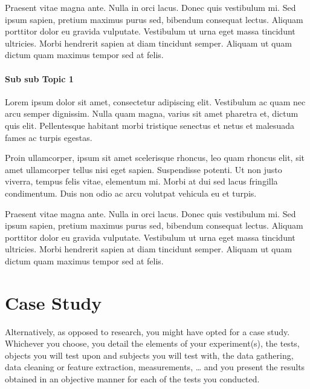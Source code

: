 \documentclass[12pt,a4paper]{report}
\newcommand{\daechapter}[1]{
  \chapter*{#1} %
  \addcontentsline{toc}{chapter}{#1} %
}
\begin{document}
\begin{gbox}
Praesent vitae magna ante. Nulla in orci lacus. Donec quis vestibulum mi. Sed ipsum sapien, pretium maximus purus sed, bibendum consequat lectus. Aliquam porttitor dolor eu gravida vulputate. Vestibulum ut urna eget massa tincidunt ultricies. Morbi hendrerit sapien at diam tincidunt semper. Aliquam ut quam dictum quam maximus tempor sed at felis.
\end{gbox}

\subsubsection{Sub sub Topic 1}

\begin{gbox}
Lorem ipsum dolor sit amet, consectetur adipiscing elit. Vestibulum ac quam nec arcu semper dignissim. Nulla quam magna, varius sit amet pharetra et, dictum quis elit. Pellentesque habitant morbi tristique senectus et netus et malesuada fames ac turpis egestas.
\end{gbox}

\begin{gbox}
Proin ullamcorper, ipsum sit amet scelerisque rhoncus, leo quam rhoncus elit, sit amet ullamcorper tellus nisi eget sapien. Suspendisse potenti. Ut non justo viverra, tempus felis vitae, elementum mi. Morbi at dui sed lacus fringilla condimentum. Duis non odio ac arcu volutpat vehicula eu et turpis.
\end{gbox}

\begin{gbox}
Praesent vitae magna ante. Nulla in orci lacus. Donec quis vestibulum mi. Sed ipsum sapien, pretium maximus purus sed, bibendum consequat lectus. Aliquam porttitor dolor eu gravida vulputate. Vestibulum ut urna eget massa tincidunt ultricies. Morbi hendrerit sapien at diam tincidunt semper. Aliquam ut quam dictum quam maximus tempor sed at felis.
\end{gbox}

\daechapter{Case Study}

\begin{ybox}
Alternatively, as opposed to research, you might have opted for a case study. Whichever you choose, you detail the elements of your experiment(s), the tests, objects you will test upon and subjects you will test with, the data gathering, data cleaning or feature extraction, measurements, … and you present the results obtained in an objective manner for each of the tests you conducted.
\end{ybox}
\end{document}
